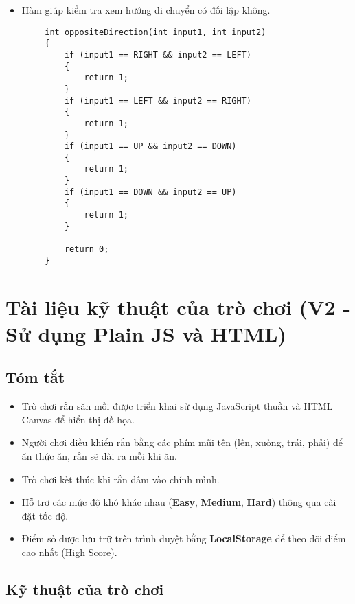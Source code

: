 \documentclass[a4paper, 12pt]{article}
\begin{document}
\begin{center}
    \begin{itemize}
        \item Hàm giúp kiểm tra xem hướng di chuyển có đối lập không.
    \end{itemize}
    
    \begin{lstlisting}
        int oppositeDirection(int input1, int input2)
        {
            if (input1 == RIGHT && input2 == LEFT)
            {
                return 1;
            }
            if (input1 == LEFT && input2 == RIGHT)
            {
                return 1;
            }
            if (input1 == UP && input2 == DOWN)
            {
                return 1;
            }
            if (input1 == DOWN && input2 == UP)
            {
                return 1;
            }
        
            return 0;
        }
    \end{lstlisting}
\end{center}

\section{Tài liệu kỹ thuật của trò chơi (V2 - Sử dụng Plain JS và HTML)}
\subsection{Tóm tắt}
\begin{itemize}
    \item Trò chơi rắn săn mồi được triển khai sử dụng JavaScript thuần và HTML Canvas để hiển thị đồ họa.
    \item Người chơi điều khiển rắn bằng các phím mũi tên (lên, xuống, trái, phải) để ăn thức ăn, rắn sẽ dài ra mỗi khi ăn.
    \item Trò chơi kết thúc khi rắn đâm vào chính mình.
    \item Hỗ trợ các mức độ khó khác nhau (\textbf{Easy}, \textbf{Medium}, \textbf{Hard}) thông qua cài đặt tốc độ.
    \item Điểm số được lưu trữ trên trình duyệt bằng \textbf{LocalStorage} để theo dõi điểm cao nhất (High Score).
\end{itemize}

\subsection{Kỹ thuật của trò chơi}
\end{document}
